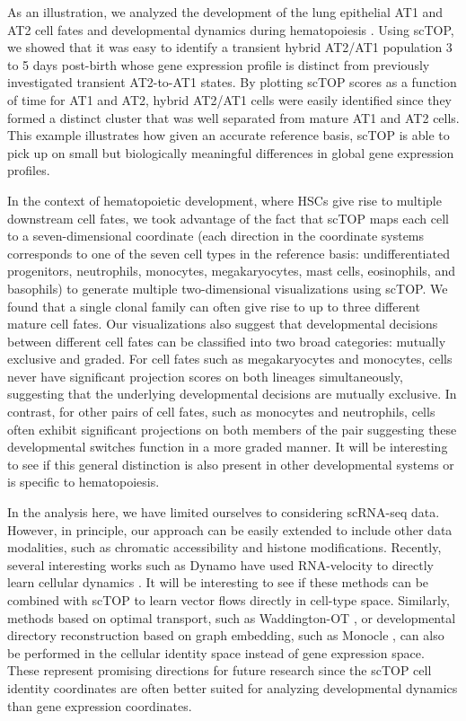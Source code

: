 \documentclass[vruler,JEB]{COB}%
\begin{document}
As an illustration, we analyzed the development of the lung epithelial AT1 and AT2 cell fates \citep{zepp2021genomic} and developmental dynamics during hematopoiesis  \citep{weinreb_lineage_2020}. Using scTOP, we showed that it was easy to identify a transient hybrid AT2/AT1 population 3 to 5 days post-birth whose gene expression profile is distinct from previously investigated transient AT2-to-AT1 states. By plotting scTOP scores as a function of time for AT1 and AT2, hybrid AT2/AT1 cells were easily identified since they formed a distinct cluster that was well separated from mature AT1 and AT2 cells. This example illustrates how given an accurate reference basis, scTOP is able to pick up on small but biologically meaningful differences in global gene expression profiles.

In the context of hematopoietic development, where HSCs give rise to multiple downstream cell fates, we took advantage of the fact that scTOP maps each cell to a seven-dimensional coordinate (each direction in the coordinate systems corresponds to one of the seven cell types in the reference basis: undifferentiated progenitors, neutrophils, monocytes, megakaryocytes, mast cells, eosinophils, and basophils) to generate multiple two-dimensional visualizations using scTOP. We found that a single clonal family can often give rise to up to three different mature cell fates. Our visualizations also suggest that developmental decisions between different cell fates can be classified into two broad categories: mutually exclusive and graded. For cell fates such as megakaryocytes and monocytes, cells never have significant projection scores on both lineages simultaneously, suggesting that the underlying developmental decisions are mutually exclusive. In contrast, for other pairs of cell fates, such as monocytes and neutrophils, cells often exhibit significant projections on both members of the pair suggesting these developmental switches function in a more graded manner. It will be interesting to see if this general distinction is also present in other developmental systems or is specific to hematopoiesis.

In the analysis here, we have limited ourselves to considering scRNA-seq data. However, in principle, our approach can be easily extended to include other data modalities, such as chromatic accessibility and histone modifications. Recently, several interesting works such as Dynamo have used RNA-velocity to directly learn cellular dynamics \citep{xing2022reconstructing, qiu2022mapping}. It will be interesting to see if these methods can be combined with scTOP to learn vector flows directly in cell-type space. Similarly, methods based on optimal transport, such as Waddington-OT \citep{schiebinger2019optimal}, or developmental directory reconstruction based on graph embedding, such as Monocle \citep{qiu2017reversed}, can also be performed in the cellular identity space instead of gene expression space. These represent promising directions for future research since the scTOP cell identity coordinates are often better suited for analyzing developmental dynamics than gene expression coordinates.
\end{document}

